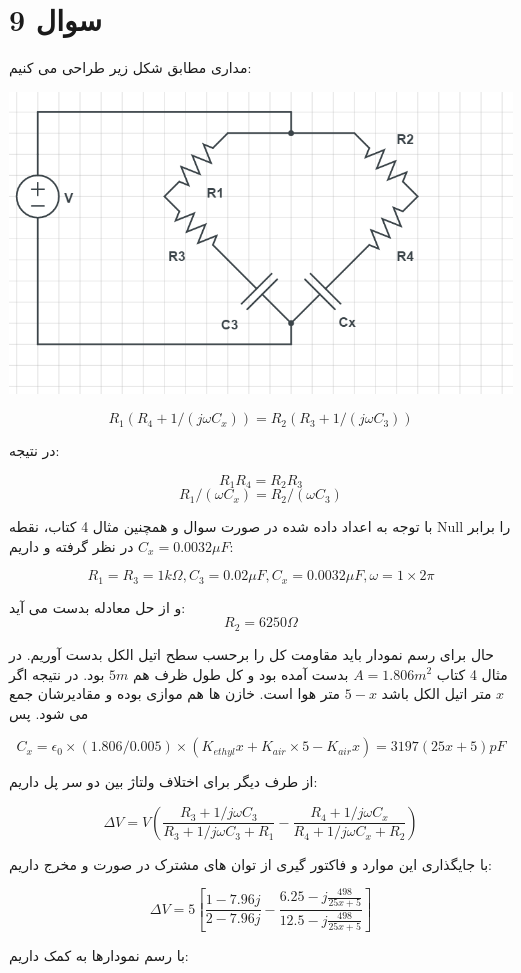 \documentclass[12pt]{article}
\begin{document}
\newpage
\section*{سوال 9}

مداری مطابق شکل زیر طراحی می کنیم:

\begin{center}
	\includegraphics[width = 0.5 \textwidth]{images/2.png}
\end{center}

$$R_{1} (R_4 + 1/(j \omega C_x) ) = R_2 (R_3 + 1/(j \omega C_3))$$

در نتیجه:

$$R_1 R_4 = R_2 R_3$$
$$R_1/(\omega C_x) = R_2 / (\omega C_3)$$

با توجه به اعداد داده شده در صورت سوال و همچنین مثال 4 کتاب، نقطه Null را برابر $C_x = 0.0032 \mu F$ در نظر گرفته و داریم:

$$R_1 = R_3 = 1 k\Omega , C_3 = 0.02 \mu F , C_x = 0.0032 \mu F , \omega = 1 \times 2 \pi $$

و از حل معادله بدست می آید:
$$R_2 = 6250 \Omega $$

حال برای رسم نمودار باید مقاومت کل را برحسب سطح اتیل الکل بدست آوریم. در مثال 4 کتاب $A=1.806 m^2$ بدست آمده بود و کل طول ظرف هم $5m$ بود. در نتیجه اگر $x$ متر اتیل الکل باشد $5-x$ متر هوا است. خازن ها هم موازی بوده و مقادیرشان جمع می شود. پس

$$C_x = \epsilon_0 \times (1.806 / 0.005) \times (K_{ethyl} x + K_{air} \times 5 - K_{air} x) = 3197 (25x + 5) pF$$

از طرف دیگر برای اختلاف ولتاژ بین دو سر پل داریم:

$$\Delta V = V (\frac{R_3 + 1/j \omega C_3}{R_3 + 1/j \omega C_3 + R_1} - \frac{R_4 + 1/j \omega C_x}{R_4 + 1/j \omega C_x  + R_2})$$

با جایگذاری این موارد و فاکتور گیری از توان های مشترک در صورت و مخرج داریم:

$$
\Delta V = 5 \left[\frac{1-7.96 j}{2-7.96 j}-\frac{6.25-j \frac{498}{25 x+5}}{12.5-j \frac{498}{25 x+5}}\right]
$$

با رسم نمودارها به کمک  داریم:
\end{document}

